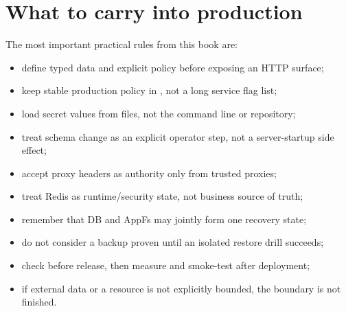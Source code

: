 \section{What to carry into production}

The most important practical rules from this book are:

\begin{itemize}
  \item define typed data and explicit policy before exposing an HTTP surface;
  \item keep stable production policy in , not a long service flag list;
  \item load secret values from files, not the command line or repository;
  \item treat schema change as an explicit operator step, not a server-startup side effect;
  \item accept proxy headers as authority only from trusted proxies;
  \item treat Redis as runtime/security state, not business source of truth;
  \item remember that DB and AppFs may jointly form one recovery state;
  \item do not consider a backup proven until an isolated restore drill succeeds;
  \item check before release, then measure and smoke-test after deployment;
  \item if external data or a resource is not explicitly bounded, the boundary is not finished.
\end{itemize}
